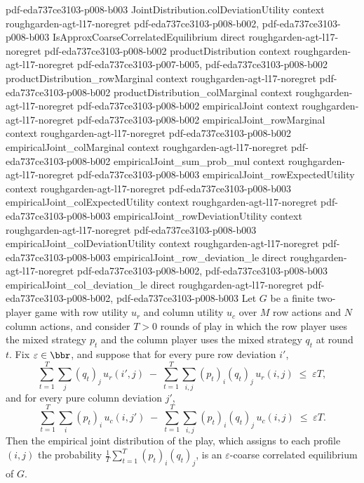 \begin{theorem}
{    pdf-eda737ce3103-p008-b003}
\proofstep
  {JointDistribution.colDeviationUtility}
  {context}
  {roughgarden-agt-l17-noregret}
  {pdf-eda737ce3103-p008-b002,
    pdf-eda737ce3103-p008-b003}
\proofstep
  {IsApproxCoarseCorrelatedEquilibrium}
  {direct}
  {roughgarden-agt-l17-noregret}
  {pdf-eda737ce3103-p008-b002}
\proofstep
  {productDistribution}
  {context}
  {roughgarden-agt-l17-noregret}
  {pdf-eda737ce3103-p007-b005,
    pdf-eda737ce3103-p008-b002}
\proofstep
  {productDistribution_rowMarginal}
  {context}
  {roughgarden-agt-l17-noregret}
  {pdf-eda737ce3103-p008-b002}
\proofstep
  {productDistribution_colMarginal}
  {context}
  {roughgarden-agt-l17-noregret}
  {pdf-eda737ce3103-p008-b002}
\proofstep
  {empiricalJoint}
  {context}
  {roughgarden-agt-l17-noregret}
  {pdf-eda737ce3103-p008-b002}
\proofstep
  {empiricalJoint_rowMarginal}
  {context}
  {roughgarden-agt-l17-noregret}
  {pdf-eda737ce3103-p008-b002}
\proofstep
  {empiricalJoint_colMarginal}
  {context}
  {roughgarden-agt-l17-noregret}
  {pdf-eda737ce3103-p008-b002}
\proofstep
  {empiricalJoint_sum_prob_mul}
  {context}
  {roughgarden-agt-l17-noregret}
  {pdf-eda737ce3103-p008-b003}
\proofstep
  {empiricalJoint_rowExpectedUtility}
  {context}
  {roughgarden-agt-l17-noregret}
  {pdf-eda737ce3103-p008-b003}
\proofstep
  {empiricalJoint_colExpectedUtility}
  {context}
  {roughgarden-agt-l17-noregret}
  {pdf-eda737ce3103-p008-b003}
\proofstep
  {empiricalJoint_rowDeviationUtility}
  {context}
  {roughgarden-agt-l17-noregret}
  {pdf-eda737ce3103-p008-b003}
\proofstep
  {empiricalJoint_colDeviationUtility}
  {context}
  {roughgarden-agt-l17-noregret}
  {pdf-eda737ce3103-p008-b003}
\proofstep
  {empiricalJoint_row_deviation_le}
  {direct}
  {roughgarden-agt-l17-noregret}
  {pdf-eda737ce3103-p008-b002,
    pdf-eda737ce3103-p008-b003}
\proofstep
  {empiricalJoint_col_deviation_le}
  {direct}
  {roughgarden-agt-l17-noregret}
  {pdf-eda737ce3103-p008-b002,
    pdf-eda737ce3103-p008-b003}
Let $G$ be a finite two-player game with row utility $u_r$ and column utility $u_c$ over
$M$ row actions and $N$ column actions, and consider $T > 0$ rounds of play in which the
row player uses the mixed strategy $p_t$ and the column player uses the mixed strategy
$q_t$ at round $t$. Fix $\varepsilon \in \bbr$, and suppose that for every pure row
deviation $i'$,
\[
  \sum_{t=1}^{T}\sum_{j}(q_t)_j\, u_r(i',j)
  \;-\; \sum_{t=1}^{T}\sum_{i,j}(p_t)_i (q_t)_j\, u_r(i,j)
  \;\le\; \varepsilon T,
\]
and for every pure column deviation $j'$,
\[
  \sum_{t=1}^{T}\sum_{i}(p_t)_i\, u_c(i,j')
  \;-\; \sum_{t=1}^{T}\sum_{i,j}(p_t)_i (q_t)_j\, u_c(i,j)
  \;\le\; \varepsilon T.
\]
Then the empirical joint distribution of the play, which assigns to each profile $(i,j)$
the probability $\frac{1}{T}\sum_{t=1}^{T}(p_t)_i (q_t)_j$, is an $\varepsilon$-coarse
correlated equilibrium of $G$.
\end{theorem}

